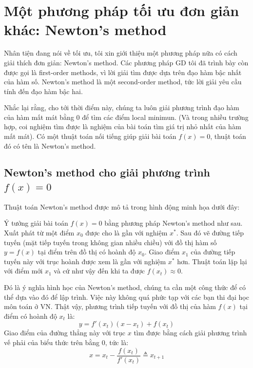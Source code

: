  
 
 
\section{Một phương pháp tối ưu đơn giản khác: Newton's method}
 
Nhân tiện đang nói về tối ưu, tôi xin giới thiệu một phương pháp nữa có cách giải thích đơn giản: Newton's method. Các phương pháp GD tôi đã trình bày còn được gọi là first-order methods, vì lời giải tìm được dựa trên đạo hàm bậc nhất của hàm số. Newton's method là một second-order method, tức lời giải yêu cầu tính đến đạo hàm bậc hai. 
 
 
Nhắc lại rằng, cho tới thời điểm này, chúng ta luôn giải phương trình đạo hàm của hàm mất mát bằng 0 để tìm các điểm local minimun. (Và trong nhiều trường hợp, coi nghiệm tìm được là nghiệm của bài toán tìm giá trị nhỏ nhất của hàm mất mát). Có một thuật toán nối tiếng giúp giải bài toán $f(x) = 0$, thuật toán đó có tên là Newton's method. 
 
 
 
\subsection{Newton's method cho giải phương trình $f(x) = 0$}
 
Thuật toán Newton's method được mô tả trong hình động minh họa dưới đây: 
 
 
 
Ý tưởng giải bài toán $f(x) = 0$ bằng phương pháp Newton's method như sau. Xuất phát từ một điểm $x_0$ được cho là gần với nghiệm $x^*$. Sau đó vẽ đường tiếp tuyến (mặt tiếp tuyến trong không gian nhiều chiều) với đồ thị hàm số $y = f(x)$ tại điểm trên đồ thị có hoành độ $x_0$. Giao điểm $x_1$ của đường tiếp tuyến này với trục hoành được xem là gần với nghiệm $x^*$ hơn. Thuật toán lặp lại với điểm mới $x_1$ và cứ như vậy đến khi ta được $f(x_t) \approx 0$. 
 
 
Đó là ý nghĩa hình học của Newton's method, chúng ta cần một công thức để có thể dựa vào đó để lập trình. Việc này không quá phức tạp với các bạn thi đại học môn toán ở VN. Thật vậy, phương trình tiếp tuyến với đồ thị của hàm $f(x)$ tại điểm có hoành độ $x_t$ là: 
\begin{equation*} 
y = f'(x_t)(x - x_t) + f(x_t) 
\end{equation*} 
Giao điểm của đường thẳng này với trục $x$ tìm được bằng cách giải phương trình vế phải của biểu thức trên bằng 0, tức là: 
\begin{equation*} 
x = x_t - \frac{f(x_t)}{f'(x_t)} \triangleq x_{t+1} 
\end{equation*} 
 
